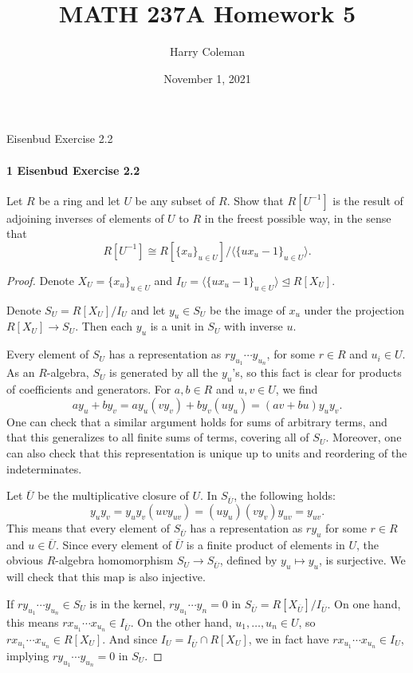 \documentclass[12pt]{article}
\renewcommand{\maketitle}{\thispagestyle{title}}
\newlength{\myparskip}
\newenvironment{fullbox}{\begin{lrbox}{\savefullbox}\begin{minipage}{\dimexpr\textwidth-2\fboxsep\relax}\setlength{\parskip}{\myparskip}}{\end{minipage}\end{lrbox}\framebox[\textwidth]{\usebox{\savefullbox}}}
\newenvironment{pbox}[1][]{\begin{fullbox}\ifx#1\empty\else\paragraph{#1}\fi}{\end{fullbox}}
\newcommand{\<}{\langle}
\renewcommand{\>}{\rangle}
\newcommand{\isom}{\cong}
\newcommand{\clo}{\overline}
\newcommand{\teq}{\trianglelefteq}
\begin{document}
\title{MATH 237A Homework 5}
\author{Harry Coleman\makebox[0pt][r]{\raisebox{-0.25in}[0pt][0pt]{(worked with Joseph Sullivan)}}}
\date{November 1, 2021}
\maketitle

\begin{pbox}[1 Eisenbud Exercise 2.2]
    Let $R$ be a ring and let $U$ be any subset of $R$. Show that $R[U^{-1}]$ is the result of adjoining inverses of elements of $U$ to $R$ in the freest possible way, in the sense that
    \[
        R[U^{-1}] \isom R[\{x_u\}_{u \in U}]/\<\{ux_u - 1\}_{u \in U}\>.
    \]
\end{pbox}

\begin{proof}
    Denote $X_U = \{x_u\}_{u \in U}$ and $I_U = \<\{ux_u - 1\}_{u \in U}\> \teq R[X_U]$. 
    
    Denote $S_U = R[X_U]/I_U$ and let $y_u \in S_U$ be the image of $x_u$ under the projection $R[X_U] \to S_U$. Then each $y_u$ is a unit in $S_U$ with inverse $u$.

    Every element of $S_U$ has a representation as $ry_{u_1} \cdots y_{u_n}$, for some $r \in R$ and $u_i \in U$. As an $R$-algebra, $S_U$ is generated by all the $y_u$'s, so this fact is clear for products of coefficients and generators. For $a, b \in R$ and $u, v \in U$, we find
    \[
        ay_u + by_v
            = ay_u(vy_v) + by_v(uy_u)
            = (av + bu)y_uy_v.
    \]
    One can check that a similar argument holds for sums of arbitrary terms, and that this generalizes to all finite sums of terms, covering all of $S_U$. Moreover, one can also check that this representation is unique up to units and reordering of the indeterminates.

    Let $\clo{U}$ be the multiplicative closure of $U$. In $S_{\clo{U}}$, the following holds:
    \[
        y_uy_v
         = y_uy_v(uvy_{uv})
         = (uy_u)(vy_v)y_{uv}
         = y_{uv}.
    \]
    This means that every element of $S_{\clo{U}}$ has a representation as $ry_u$ for some $r \in R$ and $u \in \clo{U}$. Since every element of $\clo{U}$ is a finite product of elements in $U$, the obvious $R$-algebra homomorphism $S_U \to S_{\clo{U}}$, defined by $y_u \mapsto y_u$, is surjective. We will check that this map is also injective.

    If $ry_{u_1} \cdots y_{u_n} \in S_U$ is in the kernel, $ry_{u_1} \cdots y_{n} = 0$ in $S_{\clo{U}} = R[X_{\clo{U}}]/I_{\clo{U}}$. On one hand, this means $rx_{u_1} \cdots x_{u_n} \in I_{\clo{U}}$. On the other hand, $u_1, \dots, u_n \in U$, so $rx_{u_1} \cdots x_{u_n} \in R[X_U]$. And since $I_U = I_{\clo{U}} \cap R[X_U]$, we in fact have $rx_{u_1} \cdots x_{u_n} \in I_U$, implying $ry_{u_1} \cdots y_{u_n} = 0$ in $S_U$.


\end{proof}
\end{document}
